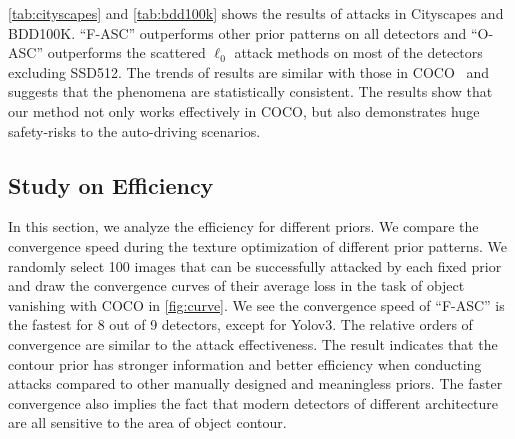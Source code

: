 \documentclass[times,twocolumn,final,authoryear]{elsarticle}
\begin{document}
\cref{tab:cityscapes} and \cref{tab:bdd100k} shows the results of attacks in Cityscapes and BDD100K. ``F-ASC'' outperforms other prior patterns on all detectors and ``O-ASC'' outperforms the scattered $\ell_0$ attack methods on most of the detectors excluding SSD512. The trends of results are similar with those in COCO~\citep{lin2014microsoft} and suggests that the phenomena are statistically consistent. The results show that our method not only works effectively in COCO, but also demonstrates huge safety-risks to the auto-driving scenarios. 




\subsection{Study on Efficiency}

In this section, we analyze the efficiency for different priors. We compare the convergence speed during the texture optimization of different prior patterns. We randomly select 100 images that can be successfully attacked by each fixed prior and draw the convergence curves of their average loss in the task of object vanishing with COCO in \cref{fig:curve}. We see the convergence speed of ``F-ASC'' is the fastest for 8 out of 9 detectors, except for Yolov3. The relative orders of convergence are similar to the attack effectiveness. The result indicates that the contour prior has stronger information and better efficiency when conducting attacks compared to other manually designed and meaningless priors. The faster convergence also implies the fact that modern detectors of different architecture are all sensitive to the area of object contour.
\end{document}
